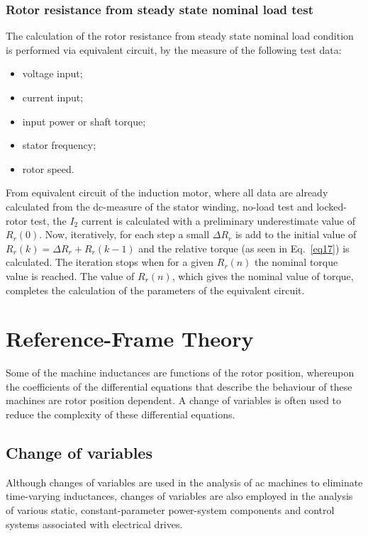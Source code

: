 \documentclass[12pt,a4paper]{scrartcl}
\begin{document}
\begin{onehalfspace}
\subsubsection{Rotor resistance from steady state nominal load test}
The calculation of the rotor resistance from steady state nominal load condition is performed via equivalent circuit, by the measure of the following test data:
\begin{itemize}
	\item voltage input;
	\item current input;
	\item input power or shaft torque;
	\item stator frequency;
	\item rotor speed.
\end{itemize}
From equivalent circuit of the induction motor, where all data are already calculated from the dc-measure of the stator winding, no-load test and locked-rotor test, the $I_2$ current is calculated with a preliminary underestimate value of $R_r(0)$. Now, iteratively, for each step a small $\Delta R_r$ is add to the initial value of $R_r(k)=\Delta R_r+R_r(k-1)$ and the relative torque (as seen in Eq.~\eqref{eq17}) is calculated. The iteration stops when for a given $R_r(n)$ the nominal torque value is reached. The value of $R_r(n)$, which gives the nominal value of torque, completes the calculation of the parameters of the equivalent circuit.

\section{Reference-Frame Theory}
Some of the machine inductances are functions of the rotor position, whereupon the coefficients of the differential equations that describe the behaviour of these machines are rotor position dependent. A change of variables is often used to reduce the complexity of these differential equations.

\subsection{Change of variables}
Although changes of variables are used in the analysis of ac machines to eliminate time-varying inductances, changes of variables are also employed in the analysis of various static, constant-parameter power-system components and control systems associated with electrical drives.


\end{onehalfspace}
\end{document}
